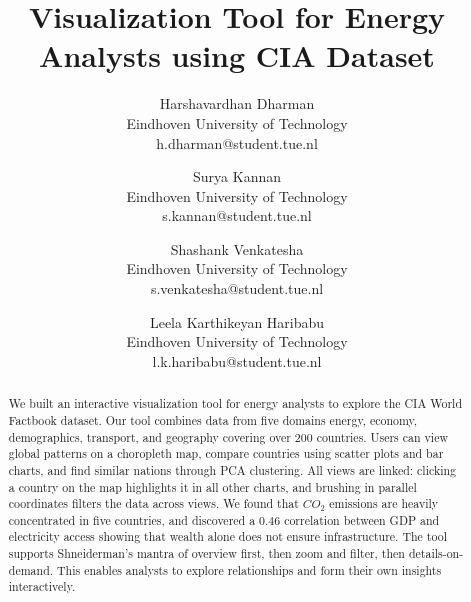 \documentclass[conference]{IEEEtran}
\begin{document}
\title{Visualization Tool for Energy Analysts using CIA Dataset}
\author{
    Harshavardhan Dharman\\
    \scriptsize Eindhoven University of Technology\\
    \scriptsize h.dharman@student.tue.nl
\and
    Surya Kannan\\
    \scriptsize Eindhoven University of Technology\\
    \scriptsize s.kannan@student.tue.nl
\and
    Shashank Venkatesha\\
    \scriptsize Eindhoven University of Technology\\
    \scriptsize s.venkatesha@student.tue.nl
\and
    Leela Karthikeyan Haribabu\\
    \scriptsize Eindhoven University of Technology\\
    \scriptsize l.k.haribabu@student.tue.nl
}



\maketitle
{\color{blue}
\begin{abstract}
We built an interactive visualization tool for energy analysts to explore the CIA World Factbook dataset. Our tool combines data from five domains energy, economy, demographics, transport, and geography covering over 200 countries. Users can view global patterns on a choropleth map, compare countries using scatter plots and bar charts, and find similar nations through PCA clustering. All views are linked: clicking a country on the map highlights it in all other charts, and brushing in parallel coordinates filters the data across views. We found that $CO_2$ emissions are heavily concentrated in five countries, and discovered a 0.46 correlation between GDP and electricity access showing that wealth alone does not ensure infrastructure. The tool supports Shneiderman's mantra of overview first, then zoom and filter, then details-on-demand. This enables analysts to explore relationships and form their own insights interactively.
\end{abstract}
}
\end{document}

